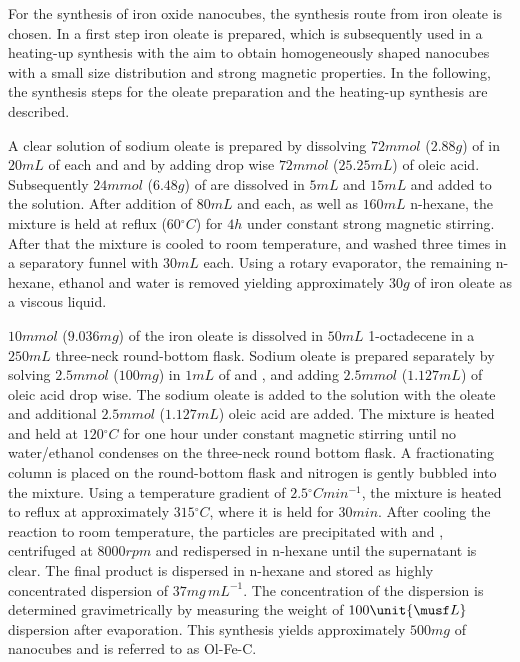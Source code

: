 \documentclass[\main/dresen_thesis.tex]{subfiles}
\begin{document}
  \label{sec:colloidalCrystals:nanoparticle:synthesisOleatesAcAc}
  For the synthesis of iron oxide nanocubes, the synthesis route from iron oleate is chosen.
  In a first step iron oleate is prepared, which is subsequently used in a heating-up synthesis with the aim to obtain homogeneously shaped nanocubes with a small size distribution and strong magnetic properties.
  In the following, the synthesis steps for the oleate preparation and the heating-up synthesis are described.

    A clear solution of sodium oleate is prepared by dissolving $72 \unit{mmol}$ ($2.88 \unit{g}$) of  in $20 \unit{mL}$ of each  and  and by adding drop wise $72 \unit{mmol}$ ($25.25 \unit{mL}$) of oleic acid.
    Subsequently $24 \unit{mmol}$ ($6.48 \unit{g}$) of  are dissolved in $5 \unit{mL}$  and $15 \unit{mL}$  and added to the solution.
    After addition of $80 \unit{mL}$  and  each, as well as $160 \unit{mL}$ n-hexane, the mixture is held at reflux ($60 \unit{^\circ C}$) for $4 \unit{h}$ under constant strong magnetic stirring.
    After that the mixture is cooled to room temperature, and washed three times in a separatory funnel with $30 \unit{mL}$  each.
    Using a rotary evaporator, the remaining n-hexane, ethanol and water is removed yielding approximately $30 \unit{g}$ of iron oleate as a viscous liquid.

    $10 \unit{mmol}$ ($9.036 \unit{mg}$) of the iron oleate is dissolved in $50 \unit{mL}$ 1-octadecene in a $250 \unit{mL}$ three-neck round-bottom flask.
    Sodium oleate is prepared separately by solving $2.5 \unit{mmol}$ ($100 \unit{mg}$)  in $1 \unit{mL}$ of  and , and adding $2.5 \unit{mmol}$ ($1.127 \unit{mL}$) of oleic acid drop wise.
    The sodium oleate is added to the solution with the oleate and additional $2.5 \unit{mmol}$ ($1.127 \unit{mL}$) oleic acid are added.
    The mixture is heated and held at $120 \unit{^\circ C}$ for one hour under constant magnetic stirring until no water/ethanol condenses on the three-neck round bottom flask.
    A fractionating column is placed on the round-bottom flask and nitrogen is gently bubbled into the mixture.
    Using a temperature gradient of $2.5 \unit{^\circ C min^{-1}}$, the mixture is heated to reflux at approximately $315 \unit{^\circ C}$, where it is held for $30 \unit{min}$.
    After cooling the reaction to room temperature, the particles are precipitated with  and , centrifuged at $8000 \unit{rpm}$ and redispersed in n-hexane until the supernatant is clear.
    The final product is dispersed in n-hexane and stored as highly concentrated dispersion of $37 \unit{mg \, mL^{-1}}$.
    The concentration of the dispersion is determined gravimetrically by measuring the weight of $100 \unit{\musf L}$ dispersion after evaporation.
    This synthesis yields approximately $500 \unit{mg}$ of nanocubes and is referred to as Ol-Fe-C.
  
\end{document}
